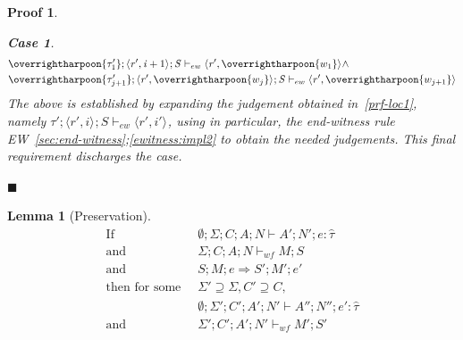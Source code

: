 \documentclass[showabstract,showacknowledgments,showpreface,showdedication,school]{iuphd}
\newtheorem{lemma}[theorem]{Lemma}
\newtheorem*{bcase}{Case}
\theoremstyle{nonumberplain}
\newtheorem{nproof}{Proof}
\newcommand{\keywd}[1]{\mathit{#1}}
\newcommand{\skeywd}[1]{\mathit{#1}}
\newcommand{\EXPR}{\keywd{e}}
\newcommand{\TYP}{\keywd{\tau}}
\newcommand{\hTYP}{\keywd{\hat{\tau}}}
\newcommand{\concreteloc}[3]{\ensuremath{\langle #1, #2 \rangle ^{#3}}}
\newcommand{\reg}{\skeywd{r}}
\newcommand{\ind}{\keywd{i}}
\newcommand{\STOR}{\keywd{S}}
\newcommand{\stepsto}{\Rightarrow}
\newcommand{\CENV}{\keywd{C}}
\newcommand{\SENV}{\keywd{\Sigma}}
\newcommand{\MENV}{\keywd{M}}
\newcommand{\AENV}{\keywd{A}}
\newcommand{\NENV}{\keywd{N}}
\newcommand{\ewitness}[4]{\ensuremath{#1;#2;#3 \vdash_{ew} #4}}
\newcommand{\storewf}[6]{\ensuremath{#1;#2;#3;#4 \vdash_{wf} #5;#6}}
\newcommand{\refendwitness}[2]{EW~\ref{#1};\ref{#2}}
\newcommand{\emptytenv}{\emptyset}
\newcommand{\overharpoon}[1]{\overrightharpoon{#1}}
\begin{document}
\begin{nproof}
\begin{bcase}
        \begin{align*}
    & \ewitness{\overharpoon{\TYP'_{1}}}{\concreteloc{\reg'}{\ind + 1}{}}{\STOR}{\concreteloc{\reg'}{\overharpoon{w_1}}{}} \wedge \\
    & \ewitness{\overharpoon{\TYP'_{j+1}}}{\concreteloc{\reg'}{\overharpoon{w_j}}{}}{\STOR}{\concreteloc{\reg'}{\overharpoon{w_{j+1}}}{}}
    \end{align*}
    The above is established by expanding the judgement obtained in~\ref{prf-loc1}, namely
    $\ewitness{\TYP'}{\concreteloc{\reg'}{\ind}{}}{\STOR}{\concreteloc{\reg'}{\ind'}{}}$,
    using in particular, the end-witness rule
    \refendwitness{sec:end-witness}{ewitness:impl2} to obtain the
    needed judgements.
    This final requirement discharges the case.
  \end{bcase}

$\blacksquare$

\end{nproof}

\begin{lemma}[Preservation]
  \label{lemma:preservation}
  \begin{displaymath}
    \begin{aligned}
      \text{If} \;\; & \emptytenv;\SENV;\CENV;\AENV;\NENV \vdash \AENV';\NENV';\EXPR : \hTYP \\
      \text{and} \;\; & \storewf{\SENV}{\CENV}{\AENV}{\NENV}{\MENV}{\STOR}\\
      \text{and} \;\; & \STOR;\MENV;\EXPR \stepsto \STOR';\MENV';\EXPR' \\
      \text{then for some} \;\; & \SENV' \supseteq \SENV, \CENV' \supseteq \CENV ,\\
      & \emptytenv;\SENV';\CENV';\AENV';\NENV' \vdash \AENV'';\NENV'';\EXPR' : \hTYP \\
      \text{and} \;\; & \storewf{\SENV'}{\CENV'}{\AENV'}{\NENV'}{\MENV'}{\STOR'}\\
    \end{aligned}
  \end{displaymath}
\end{lemma}
\end{document}
